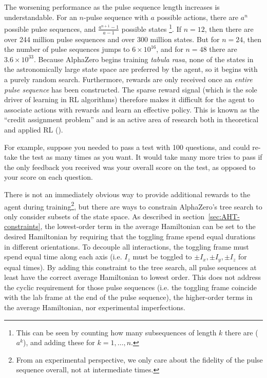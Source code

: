 The worsening performance as the pulse sequence length increases is understandable. For an $n$-pulse sequence with $a$ possible actions, there are $a^n$ possible pulse sequences, and $\frac{a^{n+1} - 1}{a-1}$ possible states%
\footnote{
This can be seen by counting how many subsequences of length $k$ there are ($a^k$), and adding these for $k = 1, \dots, n$.
}.
If $n=12$, then there are over 244 million pulse sequences and over 300 million states.
But for $n=24$, then the number of pulse sequences jumps to $6 \times 10^{16}$, and for $n=48$ there are $3.6 \times 10^{33}$. Because AlphaZero begins training \emph{tabula rasa}, none of the states in the astronomically large state space are preferred by the agent, so it begins with a purely random search.
Furthermore, rewards are only received once an \emph{entire pulse sequence} has been constructed. The sparse reward signal (which is the sole driver of learning in RL algorithms) therefore makes it difficult for the agent to associate actions with rewards and learn an effective policy.
This is known as the ``credit assignment problem'' and is an active area of research both in theoretical and applied RL (\cite{arumugam2021informationtheoretic}).

For example, suppose you needed to pass a test with 100 questions, and could re-take the test as many times as you want. It would take many more tries to pass if the only feedback you received was your overall score on the test, as opposed to your score on each question.

There is not an immediately obvious way to provide additional rewards to the agent during training\footnote{
From an experimental perspective, we only care about the fidelity of the pulse sequence overall, not at intermediate times.
},
but there are ways to constrain AlphaZero's tree search to only consider subsets of the state space.
As described in section~\ref{sec:AHT-constraints}, the lowest-order term in the average Hamiltonian can be set to the desired Hamiltonian by
requiring that the toggling frame spend equal durations in different orientations.
To decouple all interactions, the toggling frame must spend equal time along each axis (i.e. $I_z$ must be toggled to $\pm I_x, \pm I_y, \pm I_z$ for equal times).
By adding this constraint to the tree search, all pulse sequences at least have the correct average Hamiltonian to lowest order. This does not address the cyclic requirement for those pulse sequences (i.e. the toggling frame coincide with the lab frame at the end of the pulse sequence), the higher-order terms in the average Hamiltonian, nor experimental imperfections.

